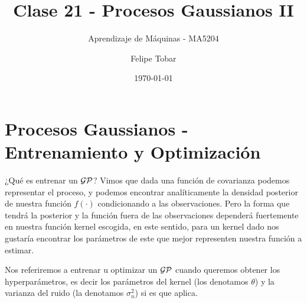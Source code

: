 \documentclass[handout, 9pt]{beamer}
\title{Clase 21 - Procesos Gaussianos II}
\subtitle{Aprendizaje de Máquinas - MA5204}
\date{\today}
\author{Felipe Tobar}
\institute{Department of Mathematical Engineering \&\\ Center for Mathematical Modelling\\Universidad de Chile}
\begin{document}
\begin{frame}
  \titlepage
\end{frame}

\section{Procesos Gaussianos - Entrenamiento y Optimización} 

\begin{frame}{¿Qué es entrenar un $\mathcal{GP}$?}
    Vimos que dada una función de covarianza podemos representar el proceso, y podemos encontrar analíticamente la densidad posterior de nuestra función $f(\cdot)$ condicionando a las observaciones. Pero la forma que tendrá la posterior y la función fuera de las observaciones dependerá fuertemente en nuestra función kernel escogida, en este sentido, para un kernel dado nos gustaría encontrar los parámetros de este que mejor representen nuestra función a estimar.
    \vspace{0.2cm} \pause 

    Nos referiremos a entrenar u optimizar un $\mathcal{GP}$ cuando queremos obtener los hyperparámetros, es decir los parámetros del kernel (los denotamos $\theta$) y la varianza del ruido (la denotamos $\sigma_n^2$) si es que aplica.

    
\end{frame}
\end{document}
